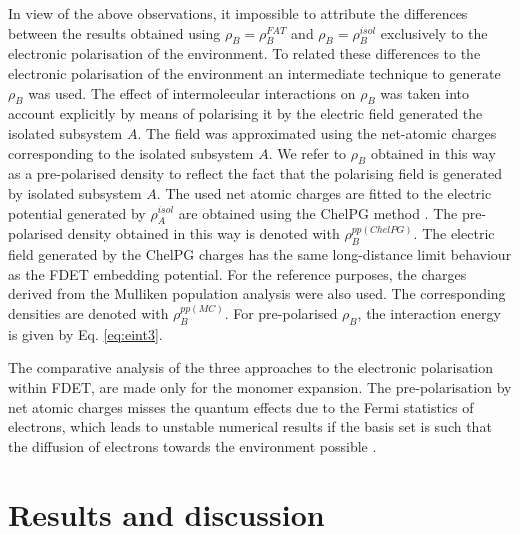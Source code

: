 \documentclass[journal=jctcce,manuscript=article]{achemso}
\begin{document}
In view of the above observations, it impossible to attribute the differences between the results obtained using $\rho_B=\rho_B^{FAT}$ and  $\rho_B=\rho_B^{isol}$  exclusively to the electronic polarisation of the environment.
To related these differences to the electronic polarisation of the environment an intermediate technique to generate 
 $\rho_B$ was used.
The effect of intermolecular interactions on 
$\rho_B$ was taken into account explicitly
 by means of polarising it by the electric field generated the isolated subsystem $A$. 
The field was approximated using the net-atomic charges corresponding to the isolated subsystem $A$.  
We refer to $\rho_B$ obtained in this way as a pre-polarised density to reflect the fact that the polarising field is generated by isolated subsystem $A$.
The used net atomic charges are fitted to the electric potential generated by $\rho_A^{isol}$  are obtained using the ChelPG method \cite{Breneman1990}.
The pre-polarised density obtained in this way is denoted with  $\rho_B^{pp(ChelPG)}$.
The electric field generated by the  ChelPG  charges has the same long-distance limit behaviour as the FDET embedding potential.
For the reference purposes,  the charges derived from the Mulliken population analysis \cite{Mulliken1955} were also used.
The corresponding densities are denoted with  $\rho_B^{pp(MC)}$.  
For pre-polarised  $\rho_B$,  the interaction energy is given by Eq. \ref{eq:eint3}.

The comparative analysis of the three approaches to the electronic polarisation within FDET, 
are made only for the monomer expansion. The pre-polarisation by net atomic charges misses the quantum effects due to the Fermi statistics of electrons, which leads to unstable numerical results if the basis set is such that the diffusion of electrons towards the environment possible  \cite{Fradelos2011a,Fradelos2011c}.

\section{Results and discussion}
\end{document}
